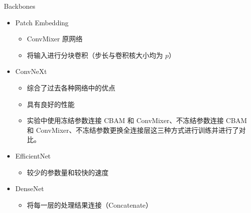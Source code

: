 \documentclass[9pt, aspectratio=1610]{beamer}
\begin{document}
    \begin{frame}{Backbones}
            \begin{itemize}
                \item Patch Embedding
                    \begin{itemize}
                    \item ConvMixer 原网络
                    \item 将输入进行分块卷积（步长与卷积核大小均为 $p$）
                    \end{itemize}
                \item ConvNeXt
                    \begin{itemize}
                    \item 综合了过去各种网络中的优点
                    \item 具有良好的性能\cite{liu2022}
                    \item 实验中使用冻结参数连接 CBAM 和 ConvMixer、不冻结参数连接 CBAM 和 ConvMixer、不冻结参数更换全连接层这三种方式进行训练并进行了对比。
                    \end{itemize}
                \item EfficientNet
                    \begin{itemize}
                    \item 较少的参数量和较快的速度\cite{tan2019}
                    \end{itemize}
                \item DenseNet
                    \begin{itemize}
                    \item 将每一层的处理结果连接（Concatenate）\cite{huang2016}
                    \end{itemize}
            \end{itemize}
        
    \end{frame}
\end{document}
